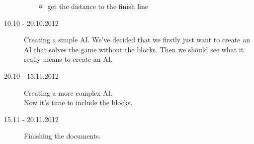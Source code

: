 \begin{description}
\begin{itemize}
\begin{itemize}
          \item get the distance to the finish line
        \end{itemize}
    \end{itemize}
  \item[10.10 - 20.10.2012] Creating a simple AI. We've decided that we firstly just want to create an AI that solves the game without the blocks. Then we should see what it really means to create an AI.
  \item[20.10 - 15.11.2012] Creating a more complex AI.\\Now it's time to include the blocks.
  \item[15.11 - 20.11.2012] Finishing the documents.
\end{description}

